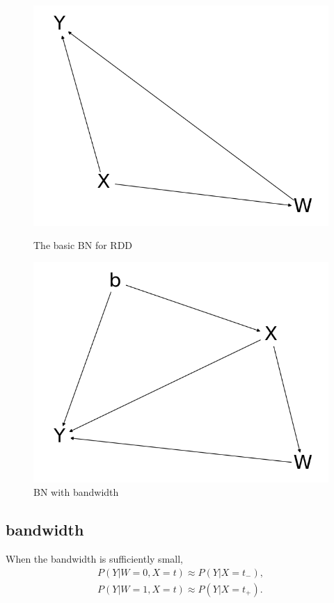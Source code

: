\documentclass[a4 paper,12pt]{article}
\begin{document}
\begin{figure}[h]
	\centering
   \includegraphics[scale=0.3]{Figure_1.png}
   \caption{The basic BN for RDD}
   \label{fig:basic_rd_bns}
   \includegraphics[scale=0.3]{Figure_2.png}
   \caption{BN with bandwidth}
   \label{fig:bn_with_bdw}
\end{figure}

\subsection*{bandwidth}
When the bandwidth is sufficiently small,
\begin{align}
   P(Y|W=0,X=t)\approx P(Y|X=t_-),\\
   P(Y|W=1,X=t)\approx P(Y|X=t_+).
\end{align}
\end{document}
